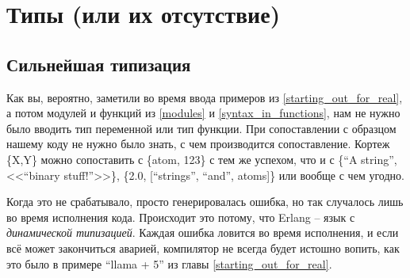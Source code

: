 \documentclass[a4paper,12pt]{report}
\newcommand{\ops}{\colorbox{lgreen}}
\begin{document}
\chapter{Типы (или их отсутствие)}
\label{types_or_lack_thereof}
\section{Сильнейшая типизация}
Как вы, вероятно, заметили во время ввода примеров из \ref{starting_out_for_real}, а потом модулей и функций из \ref{modules} и \ref{syntax_in_functions}, нам не нужно было вводить тип переменной или тип функции. При сопоставлении с образцом нашему коду не нужно было знать, с чем производится сопоставление. Кортеж \ops{\{X,Y\}} можно сопоставить с \ops{\{atom, 123\}} с тем же успехом, что и с \ops{\{``A string'', <<``binary stuff!''>>\}}, \ops{\{2.0, [``strings'', ``and'', atoms]\}} или вообще с чем угодно.

Когда это не срабатывало, просто генерировалась ошибка, но так случалось лишь во время исполнения кода. Происходит это потому, что Erlang \--- язык с \emph{динамической типизацией}. Каждая ошибка ловится во время исполнения, и если всё может закончиться аварией, компилятор не всегда будет истошно вопить, как это было в примере \ops{``llama + 5''} из главы \ref{starting_out_for_real}.
\end{document}
